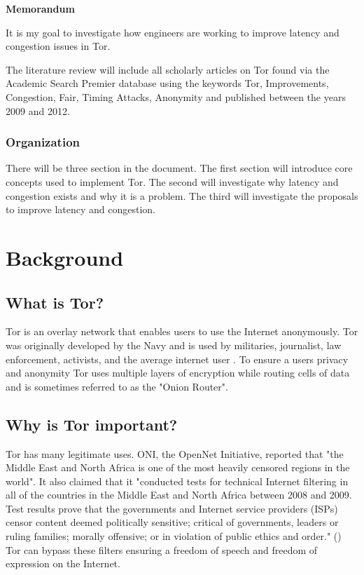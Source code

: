 \documentclass[letterpaper,12pt]{texMemo}
\begin{document}
\singlespace
\begin{center}
\large {\bf Memorandum}
\end{center}
\setlength{\topmargin}{0in}
\maketitle

It is my goal to investigate how engineers are working to improve latency and congestion issues in Tor.

The literature review will include all scholarly articles on Tor found via the Academic Search
Premier database using the keywords Tor, Improvements, Congestion, Fair, Timing Attacks,
Anonymity and published between the years 2009 and 2012.

\subsubsection*{Organization}
There will be three section in the document. The first section will introduce core concepts used to
implement Tor. The second will investigate why latency and congestion exists and why it is a
problem. The third will investigate the proposals to improve latency and congestion.

\section*{Background}

    \subsection*{What is Tor?}
    Tor is an overlay network that enables users to use the Internet anonymously. Tor was originally
    developed by the Navy and is used by militaries, journalist, law enforcement, activists, and the
    average internet user \citep[2]{Tor:web}. To ensure a users privacy and anonymity Tor uses multiple
    layers of encryption while routing cells of data and is sometimes referred to as the "Onion Router".

    \subsection*{Why is Tor important?}
    Tor has many legitimate uses. ONI, the OpenNet Initiative, reported that "the Middle East and
    North Africa is one of the most heavily censored regions in the world". It also claimed that it
    "conducted tests for technical Internet filtering in all of the countries in the Middle East
    and North Africa between 2008 and 2009. Test results prove that the governments and Internet
    service providers (ISPs) censor content deemed politically sensitive; critical of governments,
    leaders or ruling families; morally offensive; or in violation of public ethics and order." (\citeauthor[6]{ONI}) Tor
    can bypass these filters ensuring a freedom of speech and freedom of expression on the Internet.
\end{document}
